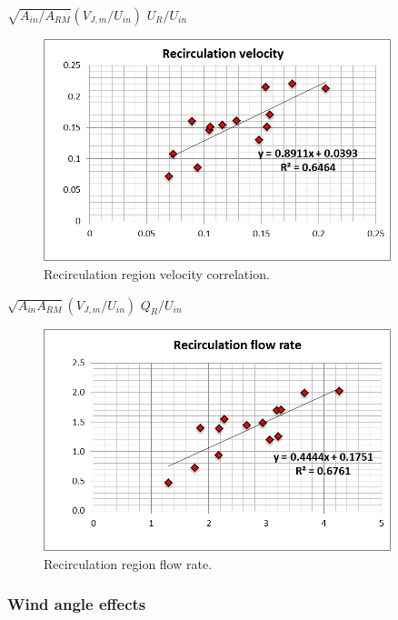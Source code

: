 \(\sqrt {{A_{in}}/{A_{RM}}} \left( {{V_{J,m}}/{U_{in}}} \right)\) \({U_R}/{U_{in}}\) 

\begin{figure}[hbtp]
\centering
\includegraphics[width=0.9\textwidth, height=0.9\textheight, keepaspectratio=true]{media/image2655.png}
\caption{Recirculation region velocity correlation. \protect \label{fig:recirculation-region-velocity}}
\end{figure}

\(\sqrt {{A_{in}}{A_{RM}}} \left( {{V_{J,m}}/{U_{in}}} \right)\) \({Q_R}/{U_{in}}\) 

\begin{figure}[hbtp]
\centering
\includegraphics[width=0.9\textwidth, height=0.9\textheight, keepaspectratio=true]{media/image2658.png}
\caption{Recirculation region flow rate. \protect \label{fig:recirculation-region-flow-rate}}
\end{figure}

\subsubsection{Wind angle effects}\label{wind-angle-effects}

